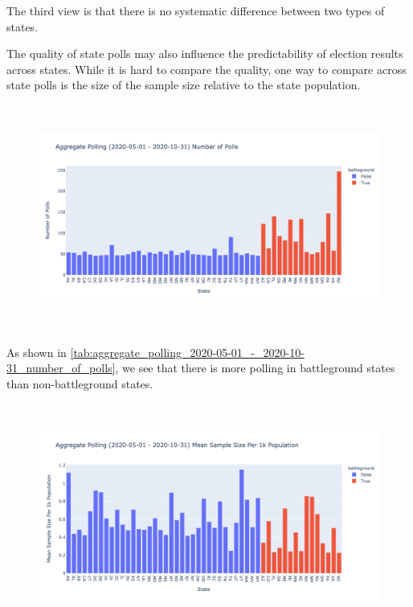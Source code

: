 The third view is that there is no systematic difference between two types of states.

The quality of state polls may also influence the predictability of election results across states. While it is hard to compare the quality, one way to compare across state polls is the size of the sample size relative to the state population. 


\begin{figure}[H]
    \centering
    \includegraphics[height=20em]{figures/aggregate_polling_2020-05-01_-_2020-10-31_number_of_polls.png}
    \caption{}
    \label{fig:aggregate_polling_2020-05-01_-_2020-10-31_number_of_polls}
\end{figure}

\begin{table}[H]

    \label{tab:aggregate_polling_2020-05-01_-_2020-10-31_number_of_polls}
\end{table}

As shown in \ref{tab:aggregate_polling_2020-05-01_-_2020-10-31_number_of_polls}, we see that there is more polling in battleground states than non-battleground states.\\

\begin{figure}[H]
    \centering
    \includegraphics[height=20em]{figures/aggregate_polling_2020-05-01_-_2020-10-31_mean_sample_size_per_1k_population.png}
    \caption{}
    \label{fig:aggregate_polling_2020-05-01_-_2020-10-31_mean_sample_size_per_1k_population}
\end{figure}

\begin{table}[H]

    \label{tab:aggregate_polling_2020-05-01_-_2020-10-31_mean_sample_size_per_1k_population}
\end{table}

